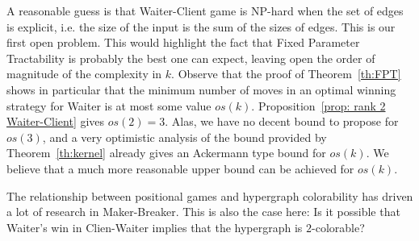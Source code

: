 \documentclass{article}
\newcommand{\hedges}{edges\xspace}
\begin{document}
A reasonable guess is that Waiter-Client game is NP-hard when the set of \hedges is explicit, i.e. the size of the input is the sum of the sizes of \hedges. This is our first open problem. This would highlight the fact that Fixed Parameter Tractability is probably the best one can expect, leaving open the order of magnitude of the complexity in $k$. Observe that the proof of Theorem~\ref{th:FPT} shows in particular that the minimum number of moves in an optimal winning strategy for Waiter is at most some value $os(k)$. Proposition~\ref{prop: rank 2 Waiter-Client} gives $os(2)=3$. Alas, we have no decent bound to propose for $os(3)$, and a very optimistic analysis of the bound provided by Theorem~\ref{th:kernel} already gives an Ackermann type bound for $os(k)$. We believe that a much more reasonable upper bound can be achieved for $os(k)$.






The relationship between positional games and hypergraph colorability has driven a lot of research in Maker-Breaker. This is also the case here: 
Is it possible that Waiter's win in Clien-Waiter implies that the hypergraph is \(2\)-colorable?



 
 
\end{document}

